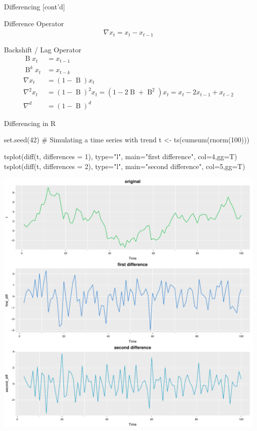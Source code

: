\documentclass[ignorenonframetext,xcolor=x11names]{beamer}
\begin{document}
\begin{frame}{Differencing \small [cont'd]}
\begin{block}{Difference Operator}
\vspace{-\baselineskip}
\begin{align*}\nabla x_t = x_t - x_{t-1}\end{align*}
\vspace{-\baselineskip}
\end{block}
\begin{block}{Backshift / Lag Operator}
\vspace{-\baselineskip}
\begin{align*}\operatorname{B} x_t &= x_{t-1} \\
\operatorname{B}^k x_t &= x_{t-k} \\
\nabla x_t &= (1-\operatorname{B})x_t \\
\nabla^2 x_t &= (1-\operatorname{B})^2 x_t= (1-2 \operatorname{B} + \operatorname{B}^2)x_t = x_t - 2x_{t-1} + x_{t-2} \\
\nabla^d &= (1-\operatorname{B})^d
 \end{align*}
 \vspace{-\baselineskip}
\end{block}
\end{frame}

\begin{frame}[fragile]{Differencing in R}
\begin{Rcode}
set.seed(42)
# Simulating a time series with trend
t <- ts(cumsum(rnorm(100))) 

tsplot(diff(t, differences = 1), type="l", 
    main="first difference", col=4,gg=T)
tsplot(diff(t, differences = 2), type="l", 
    main="second difference", col=5,gg=T)
\end{Rcode}
\begin{center}
\includegraphics[width=.6\textwidth]{figure40a.pdf}
\end{center}
\end{frame}
\end{document}
